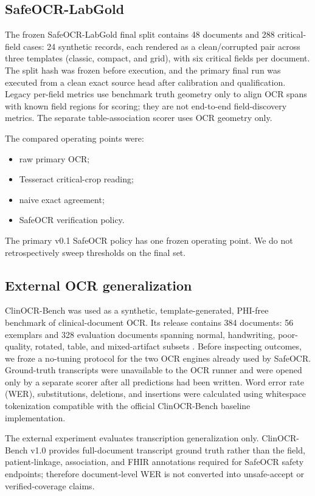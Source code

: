 \documentclass[10pt]{article}
\begin{document}
\subsection{SafeOCR-LabGold}

The frozen SafeOCR-LabGold final split contains 48 documents and 288 critical-field cases: 24 synthetic records, each rendered as a clean/corrupted pair across three templates (classic, compact, and grid), with six critical fields per document. The split hash was frozen before execution, and the primary final run was executed from a clean exact source head after calibration and qualification. Legacy per-field metrics use benchmark truth geometry only to align OCR spans with known field regions for scoring; they are not end-to-end field-discovery metrics. The separate table-association scorer uses OCR geometry only.

The compared operating points were:

\begin{itemize}
\item raw primary OCR;
\item Tesseract critical-crop reading;
\item naive exact agreement;
\item SafeOCR verification policy.
\end{itemize}

The primary v0.1 SafeOCR policy has one frozen operating point. We do not retrospectively sweep thresholds on the final set.

\subsection{External OCR generalization}

ClinOCR-Bench was used as a synthetic, template-generated, PHI-free benchmark of clinical-document OCR. Its release contains 384 documents: 56 exemplars and 328 evaluation documents spanning normal, handwriting, poor-quality, rotated, table, and mixed-artifact subsets \cite{hsu2026clinocr}. Before inspecting outcomes, we froze a no-tuning protocol for the two OCR engines already used by SafeOCR. Ground-truth transcripts were unavailable to the OCR runner and were opened only by a separate scorer after all predictions had been written. Word error rate (WER), substitutions, deletions, and insertions were calculated using whitespace tokenization compatible with the official ClinOCR-Bench baseline implementation.

The external experiment evaluates transcription generalization only. ClinOCR-Bench v1.0 provides full-document transcript ground truth rather than the field, patient-linkage, association, and FHIR annotations required for SafeOCR safety endpoints; therefore document-level WER is not converted into unsafe-accept or verified-coverage claims.
\end{document}
